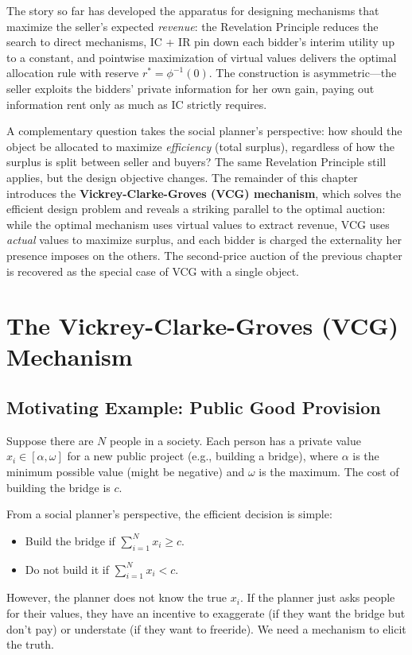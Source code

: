 The story so far has developed the apparatus for designing mechanisms that maximize the seller's expected \emph{revenue}: the Revelation Principle reduces the search to direct mechanisms, IC + IR pin down each bidder's interim utility up to a constant, and pointwise maximization of virtual values delivers the optimal allocation rule with reserve $r^* = \phi^{-1}(0)$. The construction is asymmetric---the seller exploits the bidders' private information for her own gain, paying out information rent only as much as IC strictly requires.

A complementary question takes the social planner's perspective: how should the object be allocated to maximize \emph{efficiency} (total surplus), regardless of how the surplus is split between seller and buyers? The same Revelation Principle still applies, but the design objective changes. The remainder of this chapter introduces the \textbf{Vickrey-Clarke-Groves (VCG) mechanism}, which solves the efficient design problem and reveals a striking parallel to the optimal auction: while the optimal mechanism uses virtual values to extract revenue, VCG uses \emph{actual} values to maximize surplus, and each bidder is charged the externality her presence imposes on the others. The second-price auction of the previous chapter is recovered as the special case of VCG with a single object.

\section{The Vickrey-Clarke-Groves (VCG) Mechanism}

\subsection*{Motivating Example: Public Good Provision}
Suppose there are $N$ people in a society. Each person has a private value $x_i \in [\alpha, \omega]$ for a new public project (e.g., building a bridge), where $\alpha$ is the minimum possible value (might be negative) and $\omega$ is the maximum. The cost of building the bridge is $c$.

From a social planner's perspective, the efficient decision is simple:
\begin{itemize}
    \item Build the bridge if $\sum_{i=1}^N x_i \ge c$.
    \item Do not build it if $\sum_{i=1}^N x_i < c$.
\end{itemize}
However, the planner does not know the true $x_i$. If the planner just asks people for their values, they have an incentive to exaggerate (if they want the bridge but don't pay) or understate (if they want to freeride). We need a mechanism to elicit the truth.


